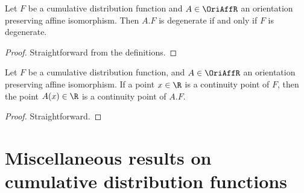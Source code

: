 \begin{lemma}
  \label{lem:degenerate-cdf-transform}
  \leanok
  Let $F$ be a cumulative distribution function
  and $A \in \OriAffR$ an orientation preserving affine isomorphism.
  Then $A.F$ is degenerate if and only if $F$ is degenerate.
\end{lemma}
\begin{proof}
  \uses{}
  \leanok
  Straightforward from the definitions.
\end{proof}

\begin{lemma}
  \label{lem:cdf-continuity-pt-transform}
  \leanok
  Let $F$ be a cumulative distribution function,
  and $A \in \OriAffR$ an orientation preserving affine isomorphism.
  If a point $x \in \R$ is a continuity point of $F$, then
  the point $A(x) \in \R$ is a continuity point of $A.F$.
\end{lemma}
\begin{proof}
  \uses{}
  Straightforward.
\end{proof}


%
%

\section{Miscellaneous results on cumulative distribution functions}

